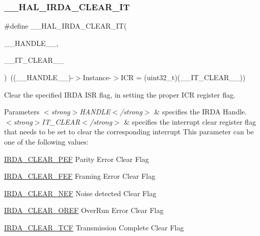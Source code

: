 \subsubsection{\texorpdfstring{\+\_\+\+\_\+\+H\+A\+L\+\_\+\+I\+R\+D\+A\+\_\+\+C\+L\+E\+A\+R\+\_\+\+IT}{\_\_HAL\_IRDA\_CLEAR\_IT}}
{\footnotesize\ttfamily \#define \+\_\+\+\_\+\+H\+A\+L\+\_\+\+I\+R\+D\+A\+\_\+\+C\+L\+E\+A\+R\+\_\+\+IT(\begin{DoxyParamCaption}\item[{}]{\+\_\+\+\_\+\+H\+A\+N\+D\+L\+E\+\_\+\+\_\+,  }\item[{}]{\+\_\+\+\_\+\+I\+T\+\_\+\+C\+L\+E\+A\+R\+\_\+\+\_\+ }\end{DoxyParamCaption})~((\+\_\+\+\_\+\+H\+A\+N\+D\+L\+E\+\_\+\+\_\+)-\/$>$Instance-\/$>$I\+CR = (uint32\+\_\+t)(\+\_\+\+\_\+\+I\+T\+\_\+\+C\+L\+E\+A\+R\+\_\+\+\_\+))}



Clear the specified I\+R\+DA I\+SR flag, in setting the proper I\+CR register flag. 


\begin{DoxyParams}{Parameters}
{\em $<$strong$>$\+H\+A\+N\+D\+L\+E$<$/strong$>$} & specifies the I\+R\+DA Handle. \\
\hline
{\em $<$strong$>$\+I\+T\+\_\+\+C\+L\+E\+A\+R$<$/strong$>$} & specifies the interrupt clear register flag that needs to be set to clear the corresponding interrupt This parameter can be one of the following values\+: \begin{DoxyItemize}
\item \hyperlink{group___i_r_d_a___i_t___c_l_e_a_r___flags_ga1ad61cf6ce6e169e1b7cd9934818bb71}{I\+R\+D\+A\+\_\+\+C\+L\+E\+A\+R\+\_\+\+P\+EF} Parity Error Clear Flag \item \hyperlink{group___i_r_d_a___i_t___c_l_e_a_r___flags_ga8974fb094f7e7c623ba81aea05de2543}{I\+R\+D\+A\+\_\+\+C\+L\+E\+A\+R\+\_\+\+F\+EF} Framing Error Clear Flag \item \hyperlink{group___i_r_d_a___i_t___c_l_e_a_r___flags_gab2fec5f35837bc513cb9fa958f482a4f}{I\+R\+D\+A\+\_\+\+C\+L\+E\+A\+R\+\_\+\+N\+EF} Noise detected Clear Flag \item \hyperlink{group___i_r_d_a___i_t___c_l_e_a_r___flags_gaef356fb07cf820843d8863ee30212a78}{I\+R\+D\+A\+\_\+\+C\+L\+E\+A\+R\+\_\+\+O\+R\+EF} Over\+Run Error Clear Flag \item \hyperlink{group___i_r_d_a___i_t___c_l_e_a_r___flags_ga90c7c32218dc7e62b918168b147ae268}{I\+R\+D\+A\+\_\+\+C\+L\+E\+A\+R\+\_\+\+T\+CF} Transmission Complete Clear Flag \end{DoxyItemize}
\\
\hline
\end{DoxyParams}

